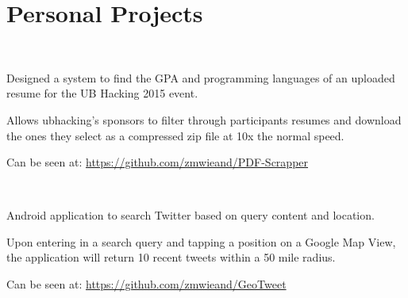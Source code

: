 \documentclass[letterpaper]{deedy-resume} %
\begin{document}
\begin{minipage}[t]{0.66\textwidth}

\section{Personal Projects} 

 \\

\begin{tightitemize}
\item Designed a system to find the GPA and programming languages of an uploaded resume for the UB Hacking 2015 event.
\item Allows ubhacking's sponsors to filter through participants resumes and download the ones they select as a compressed zip file at 10x the normal speed.
\item Can be seen at:  \url{https://github.com/zmwieand/PDF-Scrapper}
\end{tightitemize}

\sectionspace %

 \\

\begin{tightitemize}
\item Android application to search Twitter based on query content and location.
\item Upon entering in a search query and tapping a position on a Google Map View, the application will return 10 recent tweets within a 50 mile radius.
\item Can be seen at: \url{https://github.com/zmwieand/GeoTweet}
\end{tightitemize}

\sectionspace %




\end{minipage} %
\end{document}
